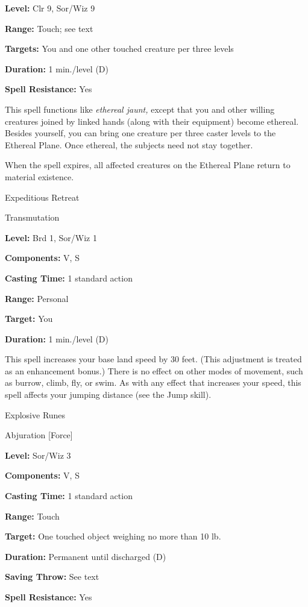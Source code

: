 \documentclass{article}
\begin{document}
\textbf{Level:} Clr 9, Sor/Wiz 9

\textbf{Range:} Touch; see text

\textbf{Targets:} You and one other touched creature per three levels

\textbf{Duration:} 1 min./level (D)

\textbf{Spell Resistance:} Yes

This spell functions like \textit{ethereal jaunt, }except that you and other willing 
creatures joined by linked hands (along with their equipment) become ethereal. 
Besides yourself, you can bring one creature per three caster levels to the Ethereal 
Plane. Once ethereal, the subjects need not stay together.

When the spell expires, all affected creatures on the Ethereal Plane return to 
material existence.

\vspace{12pt}
Expeditious Retreat

Transmutation

\textbf{Level:} Brd 1, Sor/Wiz 1

\textbf{Components:} V, S

\textbf{Casting Time:} 1 standard action

\textbf{Range:} Personal

\textbf{Target:} You

\textbf{Duration:} 1 min./level (D)

This spell increases your base land speed by 30 feet. (This adjustment is treated 
as an enhancement bonus.) There is no effect on other modes of movement, such as 
burrow, climb, fly, or swim. As with any effect that increases your speed, this 
spell affects your jumping distance (see the Jump skill).

\vspace{12pt}
Explosive Runes

Abjuration [Force]

\textbf{Level:} Sor/Wiz 3

\textbf{Components:} V, S

\textbf{Casting Time:} 1 standard action

\textbf{Range:} Touch

\textbf{Target:} One touched object weighing no more than 10 lb.

\textbf{Duration:} Permanent until discharged (D)

\textbf{Saving Throw:} See text

\textbf{Spell Resistance:} Yes
\end{document}
